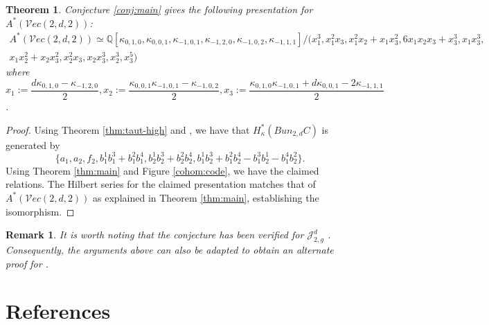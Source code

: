 \documentclass[11pt]{amsart}
\newtheorem{theorem}{Theorem}
\numberwithin{theorem}{section}
\newtheorem{rem}{Remark}
\numberwithin{lemma}{section}
\theoremstyle{definition}
\newcommand{\J}{\mathscr{J}}
\newcommand{\ve}{\mathcal{V}ec}
\newcommand{\Q}{\mathbb{Q}}
\newcommand{\ka}{\kappa}
\begin{document}
\begin{theorem}
  Conjecture \ref{conj:main} gives the following presentation for $A^*(\ve(2,d,2))$:
  \begin{gather*}A^*(\ve({2,d,2}))\simeq \Q[\ka_{0,1,0},\ka_{0,0,1},\ka_{-1,0,1},\ka_{-1,2,0},\ka_{-1,0,2},\ka_{-1,1,1}]/(x_1^3,x_1^2x_3,x_1^2x_2+x_1x_3^2,6x_1x_2x_3+x_3^3,x_1x_3^3,\\
	x_1x_2^2+x_2x_3^2,x_2^2x_3,x_2x_3^3,x_2^3,x_3^5)\end{gather*}
  where $x_1 := \dfrac{d\ka_{0,1,0}-\ka_{-1,2,0}}{2},x_2 := \dfrac{\ka_{0,0,1}\ka_{-1,0,1}-\ka_{-1,0,2}}{2},x_3 := \dfrac{\ka_{0,1,0}\ka_{-1,0,1}+d\ka_{0,0,1}-2\ka_{-1,1,1}}{2}$.
\end{theorem}
\begin{proof}
	Using Theorem \ref{thm:taut-high} and \cite[Corollary 1.2]{larson-24}, we have that $H^*_\ka(Bun_{2,d}C)$ is generated by 
$$\{a_1,a_2,f_2, b_1^1b_1^3+b_1^2b_1^4, b_2^1b_2^3+b_2^2b_2^4,b_1^1b_2^3+b_1^2b_2^4-b_1^3b_2^1-b_1^4b_2^2\}.$$
Using Theorem \ref{thm:main} and Figure \ref{cohom:code}, we have the claimed relations. The Hilbert series for the claimed presentation matches that of $A^*(\ve(2,d,2))$ as explained in Theorem \ref{thm:main}, establishing the isomorphism.
\end{proof}
\begin{rem}
	It is worth noting that the conjecture has been verified for $\J^d_{2,g}$ \cite[Theorem 1.1]{larson-24}.
	Consequently, the arguments above can also be adapted to obtain an alternate proof for \cite[Corollary 1.2]{larson-24}.
\end{rem}

\section*{References}
    \begingroup  %
    \renewcommand{\section}[2]{}%
    
    {\small}
    \endgroup  %
    
\appendix
\vspace{-0.1in}
\end{document}
